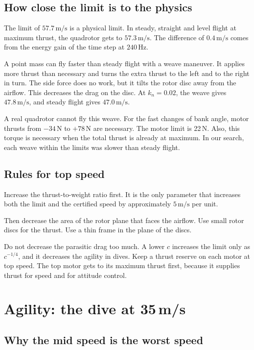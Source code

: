 \documentclass[11pt]{article}
\newcommand{\ms}{\,\mathrm{m/s}}
\begin{document}
\subsection{How close the limit is to the physics}

The limit of $57.7\ms$ is a physical limit.
In steady, straight and level flight at maximum thrust, the quadrotor gets to $57.3\ms$.
The difference of $0.4\ms$ comes from the energy gain of the time step at $240$\,Hz.

A point mass can fly faster than steady flight with a weave maneuver.
It applies more thrust than necessary and turns the extra thrust to the left and to the right in
turn.
The side force does no work, but it tilts the rotor disc away from the airflow.
This decreases the drag on the disc.
At $k_n = 0.02$, the weave gives $47.8\ms$, and steady flight gives $47.0\ms$.

A real quadrotor cannot fly this weave.
For the fast changes of bank angle, motor thrusts from $-34$\,N to $+78$\,N are necessary.
The motor limit is 22\,N.
Also, this torque is necessary when the total thrust is already at maximum.
In our search, each weave within the limits was slower than steady flight.

\subsection{Rules for top speed}

Increase the thrust-to-weight ratio first.
It is the only parameter that increases both the limit and the certified speed by approximately
$5\ms$ per unit.

Then decrease the area of the rotor plane that faces the airflow.
Use small rotor discs for the thrust.
Use a thin frame in the plane of the discs.

Do not decrease the parasitic drag too much.
A lower $c$ increases the limit only as $c^{-1/4}$, and it decreases the agility in dives.
Keep a thrust reserve on each motor at top speed.
The top motor gets to its maximum thrust first, because it supplies thrust for speed and for
attitude control.

\section{Agility: the dive at 35\,m/s}
\label{sec:agility}

\subsection{Why the mid speed is the worst speed}
\end{document}
